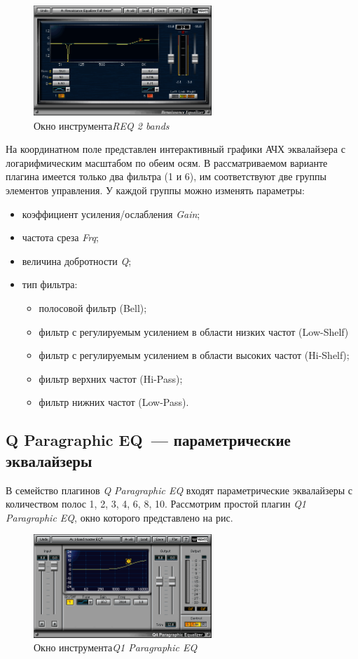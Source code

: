 \documentclass[oneside, final, 14pt]{extreport}
\begin{document}
\begin{figure}[h!]
  \centering
  \includegraphics[width=0.6\textwidth]{pic-waves-01}
  \caption{Окно инструмента\emph{REQ 2 bands}}
  \label{pic-waves-01}
\end{figure}

На координатном поле представлен интерактивный графики АЧХ эквалайзера с логарифмическим масштабом по обеим осям. В рассматриваемом варианте плагина имеется только два фильтра (1 и 6), им соответствуют две группы элементов управления. У каждой группы можно изменять параметры:
\begin{itemize}
  \item коэффициент усиления/ослабления \emph{Gain};
  \item частота среза \emph{Frq};
  \item величина добротности \emph{Q};
  \item тип фильтра: 
  \begin{itemize}
    \item полосовой фильтр (Bell);
    \item фильтр с регулируемым усилением в области низких частот (Low-Shelf)
    \item фильтр с регулируемым усилением в области высоких частот (Hi-Shelf); 
    \item фильтр верхних частот (Hi-Pass);
    \item фильтр нижних частот (Low-Pass).  
  \end{itemize}
\end{itemize}

\subsection{Q Paragraphic EQ~--- параметрические эквалайзеры}
В семейство плагинов \emph{Q Paragraphic EQ} входят параметрические эквалайзеры с количеством полос 1, 2, 3, 4, 6, 8, 10. Рассмотрим простой плагин \emph{Q1 Paragraphic EQ}, окно которого представлено на рис.

\begin{figure}[h!]
  \centering
  \includegraphics[width=0.6\textwidth]{pic-waves-02}
  \caption{Окно инструмента\emph{Q1 Paragraphic EQ}}
  \label{pic-waves-02}
\end{figure}
\end{document}
